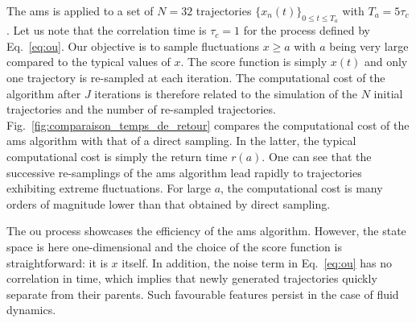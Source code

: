 \documentclass{jfm}
\newcommand{\EL}[1]{{\color{myred}{#1}}}
\newcommand{\QQ}[1]{{\color{green}{#1}}}
\begin{document}
	
	The \ac{ams} is applied  to a set of $N=32$ trajectories $\{x_n(t)\}_{0\leq t \leq T_a}$ with $T_a=5\tau_c$.
	Let us note that the correlation time is $\tau_c = 1$ for the process defined by Eq.~\eqref{eq:ou}.
	Our objective is to sample fluctuations $x\geq a$ with $a$ being very large compared to the typical values of $x$.
	The score function is simply $x(t)$ and only one trajectory is re-sampled at each iteration.
	The computational cost of the algorithm after $J$ iterations is therefore related to the simulation of the $N$ initial trajectories and the number of re-sampled trajectories.
	Fig.~\ref{fig:comparaison_temps_de_retour} compares the computational cost of the \ac{ams} algorithm with that of a direct sampling. 
	In the latter, the typical computational cost is simply the return time $r(a)$.
	One can see that the successive re-samplings of the \ac{ams} algorithm lead rapidly to trajectories exhibiting extreme fluctuations.
	For large $a$, the computational cost is many orders of magnitude lower than that obtained by direct sampling.
	
	The \acl{ou} process showcases the efficiency of the \ac{ams} algorithm.
	However, the state space is here one-dimensional and the choice of the score function is straightforward: it is $x$ itself.
	In addition, the noise term in Eq.~\eqref{eq:ou} has no correlation in time, which implies that newly generated trajectories quickly separate from their parents. Such favourable features \EL{do not} persist in the case of fluid dynamics.


















\newpage

\QQ{Appendix sur GKTL à valider : Freddy ?}
\end{document}
